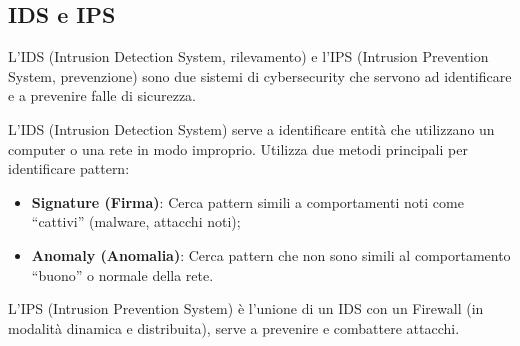 %
\subsection{IDS e IPS}
L'IDS (Intrusion Detection System, rilevamento) e l'IPS (Intrusion Prevention System, prevenzione) sono due sistemi di cybersecurity che servono ad identificare e a prevenire falle di sicurezza.

L'IDS (Intrusion Detection System) serve a identificare entità che utilizzano un computer o una rete in modo improprio. Utilizza due metodi principali per identificare pattern:
\begin{itemize}
    \item \textbf{Signature (Firma)}: Cerca pattern simili a comportamenti noti come ``cattivi'' (malware, attacchi noti);
    \item \textbf{Anomaly (Anomalia)}: Cerca pattern che non sono simili al comportamento ``buono'' o normale della rete.
\end{itemize}
L'IPS (Intrusion Prevention System) è l'unione di un IDS con un Firewall (in modalità dinamica e distribuita), serve a prevenire e combattere attacchi.